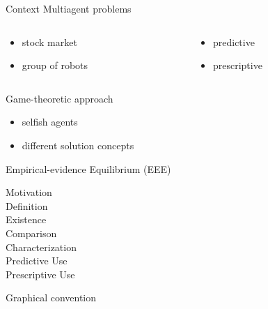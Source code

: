 \begin{frame}{Context}
Multiagent problems
\begin{columns}
\begin{column}{0.45\textwidth}
\begin{itemize}
\item stock market
\item group of robots
\end{itemize}
\end{column}
\pause
\begin{column}{0.45\textwidth}
\begin{itemize}
\item predictive
\item prescriptive
\end{itemize}
\end{column}
\end{columns}

\bigskip\bigskip
\pause
Game-theoretic approach
\begin{itemize}
\item selfish agents
\item different solution concepts
\end{itemize}
\end{frame}
\begin{frame}{Empirical-evidence Equilibrium (EEE)}
\begin{description}
\item[Motivation]
\item[Definition]
\item[Existence]
\item[Comparison]
\item[Characterization]
\item[Predictive Use]
\item[Prescriptive Use]
\end{description}
\end{frame}
\begin{frame}{Graphical convention}
\end{frame}
